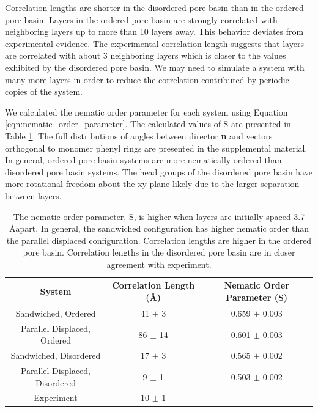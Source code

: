 \documentclass[journal=jpcbfk,manusciprt=article]{achemso}
\begin{document}
  Correlation lengths are shorter in the disordered pore basin than in the
  ordered pore basin. Layers in the ordered pore basin are strongly correlated
  with neighboring layers up to more than 10 layers away. This behavior deviates
  from experimental evidence. The experimental correlation length suggests that
  layers are correlated with about 3 neighboring layers which is closer to the
  values exhibited by the disordered pore basin. We may need to simulate a system
  with many more layers in order to reduce the correlation contributed by
  periodic copies of the system. 

  We calculated the nematic order parameter for each system using Equation
  \ref{eqn:nematic_order_parameter}. The calculated values of S are presented in
  Table \ref{table:nematic}. The full distributions of angles between director
  \textbf{n} and vectors orthogonal to monomer phenyl rings are presented in the
  supplemental material. In general, ordered pore basin systems are more
  nematically ordered than disordered pore basin systems. The head groups of the
  disordered pore basin have more rotational freedom about the xy plane likely
  due to the larger separation between layers. 

  \begin{table}[h]
  \centering
  \begin{tabular}{ccc}
  \toprule
  System & Correlation Length (\AA) & Nematic Order Parameter (S) \\
  \midrule
  Sandwiched, Ordered & 41 $\pm$ 3 & 0.659 $\pm$ 0.003 \\
  Parallel Displaced, Ordered & 86 $\pm$ 14 & 0.601 $\pm$ 0.003 \\
  Sandwiched, Disordered & 17 $\pm$ 3 & 0.565 $\pm$ 0.002 \\
  Parallel Displaced, Disordered & 9 $\pm$ 1 & 0.503 $\pm$ 0.002 \\
  Experiment & 10 $\pm$ 1 & -- \\
  \bottomrule
  \end{tabular}
  \caption{The nematic order parameter, S, is higher when layers are initially spaced
  3.7 \AA apart. In general, the sandwiched configuration has higher nematic order
  than the parallel displaced configuration. Correlation lengths are higher in
  the ordered pore basin. Correlation lengths in the disordered pore basin are
  in closer agreement with experiment.}~\label{table:nematic}
  \end{table}
\end{document}
